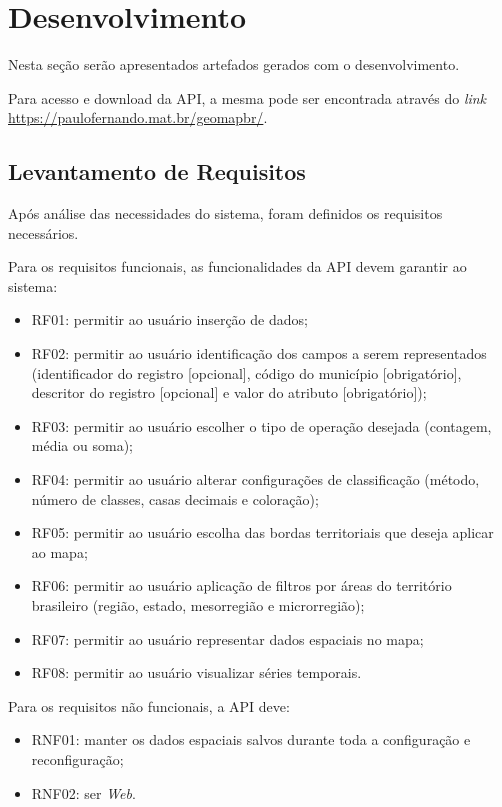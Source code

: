 \documentclass[12pt]{article}
\begin{document}
\section{Desenvolvimento} \label{desenvolvimento}

Nesta seção serão apresentados artefados gerados com o desenvolvimento.

Para acesso e download da API, a mesma pode ser encontrada através do \textit{link} \href{https://paulofernando.mat.br/geomapbr/}{https://paulofernando.mat.br/geomapbr/}.

\subsection{Levantamento de Requisitos}

Após análise das necessidades do sistema, foram definidos os requisitos necessários.

Para os requisitos funcionais, as funcionalidades da API devem garantir ao sistema:

\begin{itemize}
\item RF01: permitir ao usuário inserção de dados;
\item RF02: permitir ao usuário identificação dos campos a serem representados (identificador do registro [opcional], código do município [obrigatório], descritor do registro [opcional] e valor do atributo [obrigatório]);
\item RF03: permitir ao usuário escolher o tipo de operação desejada (contagem, média ou soma);
\item RF04: permitir ao usuário alterar configurações de classificação (método, número de classes, casas decimais e coloração);
\item RF05: permitir ao usuário escolha das bordas territoriais que deseja aplicar ao mapa;
\item RF06: permitir ao usuário aplicação de filtros por áreas do território brasileiro (região, estado, mesorregião e microrregião);
\item RF07: permitir ao usuário representar dados espaciais no mapa;
\item RF08: permitir ao usuário visualizar séries temporais.
\end{itemize}

Para os requisitos não funcionais, a API deve:

\begin{itemize}
\item RNF01: manter os dados espaciais salvos durante toda a configuração e reconfiguração;
\item RNF02: ser \emph{Web}.
\end{itemize}
\end{document}
